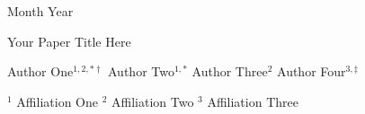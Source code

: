 \documentclass[11pt]{article}
\begin{document}
\thispagestyle{empty}

\noindent
\begin{minipage}[c]{0.5\linewidth}
\raggedright
\raisebox{-0.5\height}{\msftbrandmark}
\end{minipage}
\begin{minipage}[c]{0.49\linewidth}
\raggedleft
{\msftdatefont\small\color{msftgray}Month Year}    %
\end{minipage}\par
\vspace{0.35em}
\noindent{\color{msftline}\rule{\linewidth}{0.8pt}\par}

\vspace{1.0em}
\begin{center}
{{\msfttitlefont\fontsize{21}{25}\selectfont\color{msftdark}
Your Paper Title Here\par}}                         %
\vspace{1.25em}

{\normalsize\rmfamily\color{msftdark}
Author One$^{1,2,*\dagger}$ \hspace{0.9em}
Author Two$^{1,*}$ \hspace{0.9em}
Author Three$^{2}$ \hspace{0.9em}
Author Four$^{3, \ddagger}$\par
}
\vspace{0.22cm}

{\footnotesize\rmfamily\color{msftgray}
$^{1}$ Affiliation One \quad
$^{2}$ Affiliation Two \quad
$^{3}$ Affiliation Three\par
}
\end{center}
\end{document}
